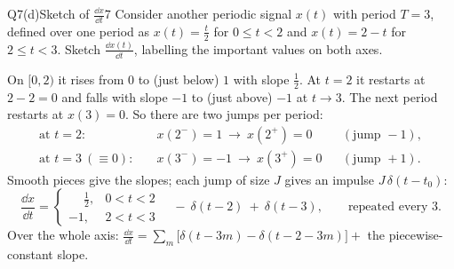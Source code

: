 \begin{qcard}{Q7(d)}{Sketch of $\frac{\dd x}{\dd t}$}{7}
Consider another periodic signal $x(t)$ with period $T=3$, defined over one period as $x(t)=\frac t2$ for $0\le t<2$ and $x(t)=2-t$ for $2\le t<3$. Sketch $\frac{\dd x(t)}{\dd t}$, labelling the important values on both axes.
\end{qcard}
\begin{solution}
 On $[0,2)$ it rises from $0$ to (just below) $1$ with slope $\frac12$. At $t=2$ it restarts at $2-2=0$ and falls with slope $-1$ to (just above) $-1$ at $t\to3$. The next period restarts at $x(3)=0$. So there are two jumps per period:
\begin{align*}
\text{at }t=2:&\quad x(2^-)=1\ \to\ x(2^+)=0 &&(\text{jump }-1),\\
\text{at }t=3\ (\equiv0):&\quad x(3^-)=-1\ \to\ x(3^+)=0 &&(\text{jump }+1).
\end{align*}
 Smooth pieces give the slopes; each jump of size $J$ gives an impulse $J\,\delta(t-t_0)$:
\[\frac{\dd x}{\dd t}=\begin{cases}\phantom{-}\tfrac12,&0<t<2\\-1,&2<t<3\end{cases}\quad-\ \delta(t-2)\ +\ \delta(t-3),\qquad\text{repeated every }3.\]
Over the whole axis: $\frac{\dd x}{\dd t}=\sum_m\big[\delta(t-3m)-\delta(t-2-3m)\big]+$ the piecewise-constant slope.

\begin{center}


\end{center}
\end{solution}
